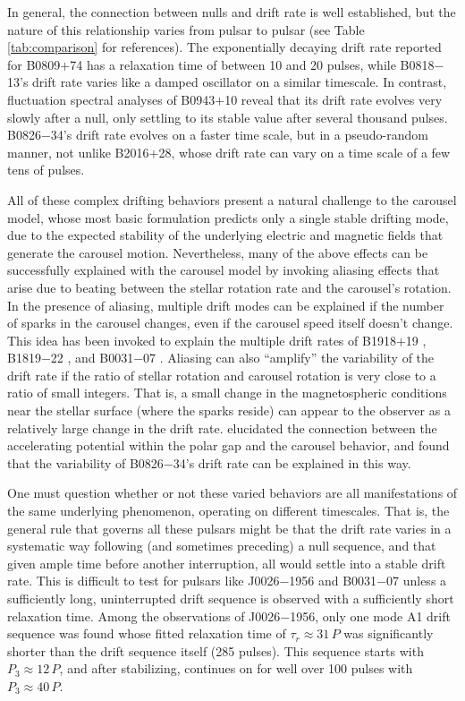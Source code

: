 \documentclass[twocolumn]{aastex631}
\newcommand{\psr}{J0026$-$1956}
\begin{document}
In general, the connection between nulls and drift rate is well established, but the nature of this relationship varies from pulsar to pulsar (see Table \ref{tab:comparison} for references).
The exponentially decaying drift rate reported for B0809$+$74 has a relaxation time of between 10 and 20 pulses, while B0818$-$13's drift rate varies like a damped oscillator on a similar timescale.
In contrast, fluctuation spectral analyses of B0943$+$10 reveal that its drift rate evolves very slowly after a null, only settling to its stable value after several thousand pulses.
B0826$-$34's drift rate evolves on a faster time scale, but in a pseudo-random manner, not unlike B2016$+$28, whose drift rate can vary on a time scale of a few tens of pulses.

All of these complex drifting behaviors present a natural challenge to the carousel model, whose most basic formulation predicts only a single stable drifting mode, due to the expected stability of the underlying electric and magnetic fields that generate the carousel motion.
Nevertheless, many of the above effects can be successfully explained with the carousel model by invoking aliasing effects that arise due to beating between the stellar rotation rate and the carousel's rotation.
In the presence of aliasing, multiple drift modes can be explained if the number of sparks in the carousel changes, even if the carousel speed itself doesn't change.
This idea has been invoked to explain the multiple drift rates of B1918$+$19 \citep{Rankin2013}, B1819$-$22 \citep{Joshi2017,Janagal2021}, and B0031$-$07 \citep{McSweeney2019a}.
Aliasing can also ``amplify'' the variability of the drift rate if the ratio of stellar rotation and carousel rotation is very close to a ratio of small integers.
That is, a small change in the magnetospheric conditions near the stellar surface (where the sparks reside) can appear to the observer as a relatively large change in the drift rate.
\citet{VanLeeuwen2012} elucidated the connection between the accelerating potential within the polar gap and the carousel behavior, and found that the variability of B0826$-$34's drift rate can be explained in this way.

One must question whether or not these varied behaviors are all manifestations of the same underlying phenomenon, operating on different timescales.
That is, the general rule that governs all these pulsars might be that the drift rate varies in a systematic way following (and sometimes preceding) a null sequence, and that given ample time before another interruption, all would settle into a stable drift rate.
This is difficult to test for pulsars like \psr{} and B0031$-$07 unless a sufficiently long, uninterrupted drift sequence is observed with a sufficiently short relaxation time.
Among the observations of \psr{}, only one mode A1 drift sequence was found whose fitted relaxation time of $\tau_r \approx 31\,P$ was significantly shorter than the drift sequence itself (285 pulses).
This sequence starts with $P_3 \approx 12\,P$, and after stabilizing, continues on for well over 100 pulses with $P_3 \approx 40\,P$.
\end{document}
